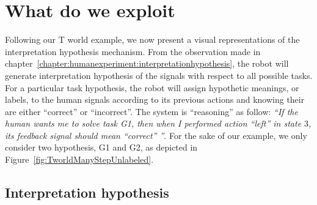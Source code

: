 \section{What do we exploit}


Following our T world example, we now present a visual representations of the interpretation hypothesis mechanism. From the observation made in chapter~\ref{chapter:humanexperiment:interpretationhypothesis}, the robot will generate interpretation hypothesis of the signals with respect to all possible tasks. For a particular task hypothesis, the robot will assign hypothetic meanings, or labels, to the human signals according to its previous actions and knowing their are either ``correct'' or ``incorrect''. The system is ``reasoning'' as follow: \textit{``If the human wants me to solve task G1, then when I performed action ``left'' in state $3$, its feedback signal should mean ``correct'' ''}. For the sake of our example, we only consider two hypothesis, G1 and G2, as depicted in Figure~\ref{fig:TworldManyStepUnlabeled}.


\subsection{Interpretation hypothesis}
\label{chapter:lfui:interpreation}



